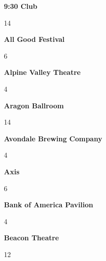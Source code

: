 \begin{center}\textbf{9:30 Club}\end{center}
\begin{center}14\end{center} 
\newline 
\begin{center}\textbf{All Good Festival}\end{center}
\begin{center}6\end{center} 
\newline 
\begin{center}\textbf{Alpine Valley Theatre}\end{center}
\begin{center}4\end{center} 
\newline 
\begin{center}\textbf{Aragon Ballroom}\end{center}
\begin{center}14\end{center} 
\newline 
\begin{center}\textbf{Avondale Brewing Company}\end{center}
\begin{center}4\end{center} 
\newline 
\begin{center}\textbf{Axis}\end{center}
\begin{center}6\end{center} 
\newline 
\begin{center}\textbf{Bank of America Pavilion}\end{center}
\begin{center}4\end{center} 
\newline 
\begin{center}\textbf{Beacon Theatre}\end{center}
\begin{center}12\end{center} 
